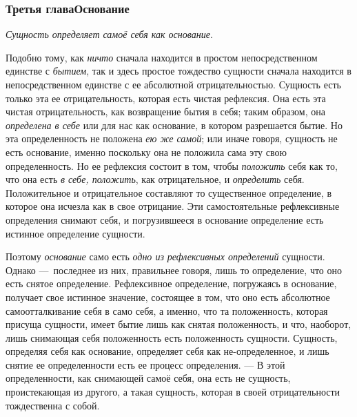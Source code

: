 \subsubsection{Третья главаОснование}
{\em Сущность определяет самоё себя как основание}.

Подобно тому, как {\em ничто} сначала находится в
простом непосредственном единстве с {\em бытием}, так и
здесь простое тождество сущности сначала находится в непосредственном
единстве с ее абсолютной отрицательностью. Сущность есть только эта ее
отрицательность, которая есть чистая рефлексия. Она есть эта чистая
отрицательность, как возвращение бытия в себя; таким образом, она
{\em определена в себе} или для нас как основание, в
котором разрешается бытие. Но эта определенность не положена
{\em ею же самой}; или иначе говоря, сущность не есть
основание, именно поскольку она не положила сама эту свою определенность.
Но ее рефлексия состоит в том, чтобы {\em положить}
себя как то, что она есть {\em в себе, положить}, как
отрицательное, и {\em определить} себя. Положительное и
отрицательное составляют то существенное определение, в которое она исчезла
как в свое отрицание. Эти самостоятельные рефлексивные определения снимают
себя, и погрузившееся в основание определение есть истинное определение
сущности.

Поэтому {\em основание} само есть
{\em одно из рефлексивных определений} сущности. Однако
—~последнее из них, правильнее говоря, лишь то определение, что оно есть
снятое определение. Рефлексивное определение, погружаясь в основание,
получает свое истинное значение, состоящее в том, что оно есть абсолютное
самоотталкивание себя в само себя, а именно, что та положенность, которая
присуща сущности, имеет бытие лишь как снятая положенность, и что,
наоборот, лишь снимающая себя положенность есть положенность сущности.
Сущность, определяя себя как основание, определяет себя как
не-определенное, и лишь снятие ее определенности есть ее процесс
определения. — В этой определенности, как снимающей самоё себя, она есть не
сущность, проистекающая из другого, а такая сущность, которая в своей
отрицательности тождественна с собой.

